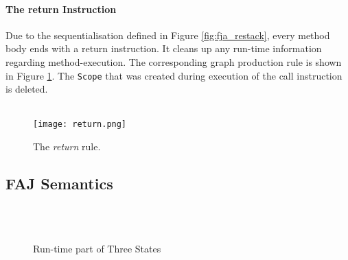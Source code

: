 \paragraph{The {\sc return} Instruction}

Due to the sequentialisation defined in Figure \ref{fig:fja_restack}, every method body ends with a {\sc return} instruction. It cleans up any run-time information regarding method-execution. The corresponding graph production rule is shown in Figure \ref{fig:return}. The {\tt Scope} that was created during execution of the {\sc call} instruction is deleted.\\
\\

\begin{figure}
	\begin{center}
		\texttt{[image: return.png]}
	\end{center}
		\caption{The \emph{return} rule.}
	\label{fig:return}
\end{figure}

\begin{comment}

\paragraph{The {\sc var} Instruction}
Figure \ref{fig:var} shows the \emph{var} rule. A {\sc var} instruction --- not to be confused with a class field access using the get instruction --- is the usage of a method argument. When the {\sc var} instruction referring to a variable name is on top of the continuation stack, the rule will match the {\tt Var} node in its scope that has that same name. The resulting value is pushed on the evaluation stack. 

\begin{figure}
	\begin{center}
		\texttt{[image: var.png]}
	\end{center}
		\caption{The \emph{var} rule.}
	\label{fig:var}
\end{figure}

\end{comment}

\subsection{FAJ Semantics}\label{sec:gr-aspects}

\begin{figure}
\centering
{}\\
\\
\caption{Run-time part of Three States}
\label{fig:example-states}
\end{figure}


